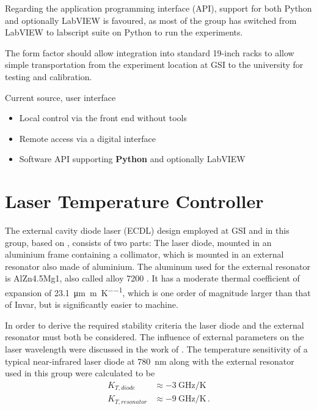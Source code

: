 Regarding the application programming interface (API), support for both Python and optionally LabVIEW is favoured, as most of the group has switched from LabVIEW to labscript suite \cite{labscript_2013} on Python to run the experiments.

The form factor should allow integration into standard 19-inch racks to allow simple transportation from the experiment location at GSI to the university for testing and calibration.

\begin{center}
    \begin{specifications}[label={lst:dgDrive_specs_api}]{Current source, user interface}
    \begin{itemize}
        \item Local control via the front end without tools
        \item Remote access via a digital interface
        \item Software API supporting \textbf{Python} and optionally LabVIEW
    \end{itemize}
    \end{specifications}
\end{center}

\clearpage
\section{Laser Temperature Controller}%
\label{sec:laser_temperatrure_controller}
The external cavity diode laser (ECDL) design employed at GSI and in this group, based on \cite{ecdl_paris}, consists of two parts: The laser diode, mounted in an aluminium frame containing a collimator, which is mounted in an external resonator also made of aluminium. The aluminum used for the external resonator is AlZn4.5Mg1, also called alloy 7200 \cite{datasheet_laser_alu}. It has a moderate thermal coefficient of expansion of \qty{23.1}{\micro\meter \per \m \per \K}, which is one order of magnitude larger than that of Invar, but is significantly easier to machine.

In order to derive the required stability criteria the laser diode and the external resonator must both be considered. The influence of external parameters on the laser wavelength were discussed in the work of \citeauthor{thesis_tilman} \cite{thesis_tilman}. The temperature sensitivity of a typical near-infrared laser diode at \qty{780}{\nm} along with the external resonator used in this group were calculated to be
\begin{align*}
    K_{T,diode} &\approx \qty{-3}{\GHz \per \K}\\
    K_{T,resonator} &\approx \qty{-9}{\GHz \per \K}\,.
\end{align*}

